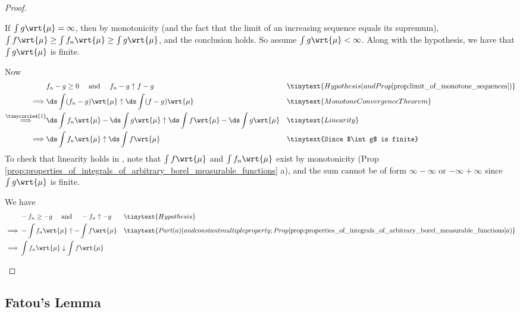 \documentclass{article} %
\newcommand{\dint}{\ds\int}
\newcommand{\dmu}{\wrt{\mu}}
\begin{document}
\begin{proof}
\begin{alphabate}
\item If $\int g \dmu = \infty$, then by monotonicity {\tiny (and the fact that the limit of an increasing sequence equals its supremum)}, $\int f \dmu \geq \int f_n \dmu \geq \int g \dmu$, and the conclusion holds.  So assume $\int g \dmu < \infty$.  Along with the hypothesis, we have that $\int g \dmu$ is finite.

Now
\begin{align*}
& f_n - g \geq 0 \quad \text{ and } \quad f_n -g \uparrow f-g && \tinytext{Hypothesis (and Prop \ref{prop:limit_of_monotone_sequences})} \\
\implies & \ds\int (f_n - g) \dmu \uparrow \ds\int (f-g) \dmu && \tinytext{Monotone Convergence Theorem}\\
\stackrel{\tinycircled{1}}{\implies} & \ds\int f_n \dmu - \ds\int g \dmu \uparrow \ds\int f \dmu - \ds\int g \dmu && \tinytext{Linearity}\\
\implies & \dint f_n \dmu \uparrow \dint f \dmu && \tinytext{Since $\int g$ is finite} 
\end{align*}	
To check that linearity holds in , note that $\int f \dmu$ and $\int f_n \dmu$ exist by monotonicity (Prop \ref{prop:properties_of_integrals_of_arbitrary_borel_measurable_functions} a), and the sum cannot be of form $\infty - \infty$ or $-\infty + \infty$ since $\int g \dmu$ is finite.
\item We have
\begin{align*}
& -f_n \geq -g \quad \text{ and } \quad -f_n \uparrow -g && \tinytext{Hypothesis} \\
\implies & - \int f_n \dmu \uparrow - \int f \dmu && \tinytext{Part (a) (and constant multiple property; Prop \ref{prop:properties_of_integrals_of_arbitrary_borel_measurable_functions} a) } \\
\implies & \int f_n \dmu \downarrow  \int f \dmu
\end{align*} 
\end{alphabate}
\end{proof}




\subsection{Fatou's Lemma}
\end{document}
